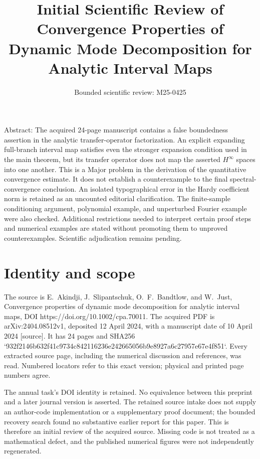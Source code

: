 \documentclass[10pt]{article}
\title{Initial Scientific Review of
Convergence Properties of Dynamic Mode
Decomposition for Analytic Interval Maps}
\author{Bounded scientific review: M25-0425}
\date{}
\begin{document}
\maketitle
Abstract: The acquired 24-page manuscript contains a false boundedness assertion in the analytic transfer-operator factorization. An explicit expanding full-branch interval map satisfies even the stronger expansion condition used in the main theorem, but its transfer operator does not map the asserted \(H^\infty\) spaces into one another. This is a Major problem in the derivation of the quantitative convergence estimate. It does not establish a counterexample to the final spectral-convergence conclusion. An isolated typographical error in the Hardy coefficient norm is retained as an uncounted editorial clarification. The finite-sample conditioning argument, polynomial example, and unperturbed Fourier example were also checked. Additional restrictions needed to interpret certain proof steps and numerical examples are stated without promoting them to unproved counterexamples. Scientific adjudication remains pending.\par
\section*{Identity and scope}
The source is E. Akindji, J. Slipantschuk, O. F. Bandtlow, and W. Just, Convergence properties of dynamic mode decomposition for analytic interval maps, DOI https://doi.org/10.1002/cpa.70011. The acquired PDF is arXiv:2404.08512v1, deposited 12 April 2024, with a manuscript date of 10 April 2024 [source]. It has 24 pages and SHA256 `932f2146b632f41c9734c842116236e242665056b9e8927a6c27957e67e4f851`. Every extracted source page, including the numerical discussion and references, was read. Numbered locators refer to this exact version; physical and printed page numbers agree.\par
The annual task’s DOI identity is retained. No equivalence between this preprint and a later journal version is asserted. The retained source intake does not supply an author-code implementation or a supplementary proof document; the bounded recovery search found no substantive earlier report for this paper. This is therefore an initial review of the acquired source. Missing code is not treated as a mathematical defect, and the published numerical figures were not independently regenerated.\par
\end{document}
